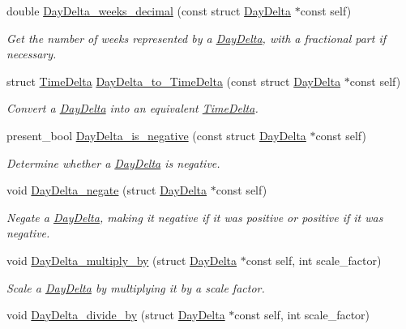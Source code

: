 \begin{DoxyCompactItemize}
double \hyperlink{day-delta_8h_af6698416f241e2d9a6f54459fd0282ef}{\-Day\-Delta\-\_\-weeks\-\_\-decimal} (const struct \hyperlink{structDayDelta}{\-Day\-Delta} $\ast$const self)
\begin{DoxyCompactList}\small\item\em \-Get the number of weeks represented by a \hyperlink{structDayDelta}{\-Day\-Delta}, with a fractional part if necessary. \end{DoxyCompactList}\item 
struct \hyperlink{structTimeDelta}{\-Time\-Delta} \hyperlink{day-delta_8h_afaef350c558f8db4d84585c9bf64d871}{\-Day\-Delta\-\_\-to\-\_\-\-Time\-Delta} (const struct \hyperlink{structDayDelta}{\-Day\-Delta} $\ast$const self)
\begin{DoxyCompactList}\small\item\em \-Convert a \hyperlink{structDayDelta}{\-Day\-Delta} into an equivalent \hyperlink{structTimeDelta}{\-Time\-Delta}. \end{DoxyCompactList}\item 
present\-\_\-bool \hyperlink{day-delta_8h_ab4347a4d40f2e9577ce86f3fb5fb004d}{\-Day\-Delta\-\_\-is\-\_\-negative} (const struct \hyperlink{structDayDelta}{\-Day\-Delta} $\ast$const self)
\begin{DoxyCompactList}\small\item\em \-Determine whether a \hyperlink{structDayDelta}{\-Day\-Delta} is negative. \end{DoxyCompactList}\item 
void \hyperlink{day-delta_8h_a9deb74bc8d748a21449a16e658f16432}{\-Day\-Delta\-\_\-negate} (struct \hyperlink{structDayDelta}{\-Day\-Delta} $\ast$const self)
\begin{DoxyCompactList}\small\item\em \-Negate a \hyperlink{structDayDelta}{\-Day\-Delta}, making it negative if it was positive or positive if it was negative. \end{DoxyCompactList}\item 
void \hyperlink{day-delta_8h_af8c4a730c36c38da48ba2d6df982c167}{\-Day\-Delta\-\_\-multiply\-\_\-by} (struct \hyperlink{structDayDelta}{\-Day\-Delta} $\ast$const self, int scale\-\_\-factor)
\begin{DoxyCompactList}\small\item\em \-Scale a \hyperlink{structDayDelta}{\-Day\-Delta} by multiplying it by a scale factor. \end{DoxyCompactList}\item 
void \hyperlink{day-delta_8h_a03f5153b765a355870053d9cf1ce5c78}{\-Day\-Delta\-\_\-divide\-\_\-by} (struct \hyperlink{structDayDelta}{\-Day\-Delta} $\ast$const self, int scale\-\_\-factor)

\end{DoxyCompactItemize}
